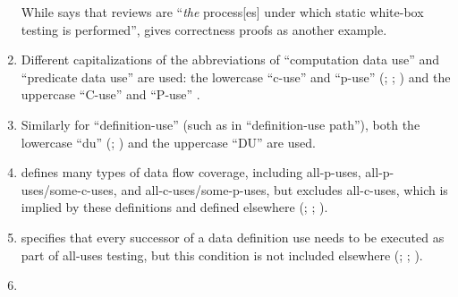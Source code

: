 \begin{enumerate}
          While \citet[p.~92\ifnotpaper, emphasis added\fi]{Patton2006}
          says that reviews are ``\emph{the} process[es] under which static
          white-box testing is performed'', \citet[pp.~418\==419]{vanVliet2000}
          gives correctness proofs as another example.
    \item %
          Different capitalizations of the abbreviations of ``computation data
          use'' and ``predicate data use'' are used: the lowercase ``\acs{c-use}''
          and ``\acs{p-use}'' (\citealp[pp.~3, 27\==29, 35\==36, 114\==155,
              117\==118, 129]{IEEE2021b}; \citeyear[p.~124]{IEEE2017};
          \citealp[p.~477, Tab.~12.6]{PetersAndPedrycz2000}) and the uppercase
          ``C-use'' and ``P-use'' \citep[pp.~424\==425]{vanVliet2000}.
    \item %
          Similarly for ``definition-use'' (such as in ``definition-use
          path''), both the lowercase ``du'' (\citealp[pp.~3, 27, 29, 35,
              119\==121, 129]{IEEE2021b}; \citealp[pp.~478\==479]{
              PetersAndPedrycz2000}) and the uppercase ``DU''
          \citep[p.~425]{vanVliet2000} are used.
    \item %
           defines many types of data
          flow coverage, including all-\acsp{p-use},
          all-\acsp{p-use}/some-\acsp{c-use}, and
          all-\acsp{c-use}/some-\acsp{p-use}, but
          excludes all-\acsp{c-use}, which is implied by these definitions and
          defined elsewhere (\citealp[p.~27]{IEEE2021b};
          \citeyear[p.~83]{IEEE2017}; \citealp[p.~479]{PetersAndPedrycz2000}).
    \item %
           specifies that every
          successor of a data definition use needs to be executed as part of
          all-uses testing, but this condition is not included elsewhere
          (\citealp[pp.~28\==29]{IEEE2021b}; \citeyear[p.~120]{IEEE2017};
          \citealp[pp.~478\==479]{PetersAndPedrycz2000}).
    \item %

\end{enumerate}
